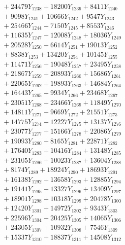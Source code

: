 \documentclass[a4paper,10pt]{article}
\begin{document}
{\begin{align}
&\;  + 24479 Y_{1238} + 18200 Y_{1239} + 8411 Y_{1240} \\[0.3ex]
&\;  + 9098 Y_{1241} + 10666 Y_{1242} + 9547 Y_{1243} \\[0.3ex]
&\;  + 25466 Y_{1244} + 7150 Y_{1245} + 8553 Y_{1246} \\[0.3ex]
&\;  + 11635 Y_{1247} + 12008 Y_{1248} + 18036 Y_{1249} \\[0.3ex]
&\;  + 20528 Y_{1250} + 6614 Y_{1251} + 19013 Y_{1252} \\[0.3ex]
&\;  + 8838 Y_{1253} + 13420 Y_{1254} + 10145 Y_{1255} \\[0.3ex]
&\;  + 11471 Y_{1256} + 19048 Y_{1257} + 23495 Y_{1258} \\[0.5ex]\allowbreak
&\;  + 21867 Y_{1259} + 20893 Y_{1260} + 15686 Y_{1261} \\[0.3ex]
&\;  + 22065 Y_{1262} + 19893 Y_{1263} + 14684 Y_{1264} \\[0.3ex]
&\;  + 16443 Y_{1265} + 9934 Y_{1266} + 23468 Y_{1267} \\[0.3ex]
&\;  + 23051 Y_{1268} + 23466 Y_{1269} + 11849 Y_{1270} \\[0.3ex]
&\;  + 14811 Y_{1271} + 9669 Y_{1272} + 21551 Y_{1273} \\[0.3ex]
&\;  + 14775 Y_{1274} + 12227 Y_{1275} + 13137 Y_{1276} \\[0.3ex]
&\;  + 23077 Y_{1277} + 15166 Y_{1278} + 22086 Y_{1279} \\[0.3ex]
&\;  + 19093 Y_{1280} + 8165 Y_{1281} + 22871 Y_{1282} \\[0.3ex]
&\;  + 17640 Y_{1283} + 10416 Y_{1284} + 13148 Y_{1285} \\[0.3ex]
&\;  + 23105 Y_{1286} + 10023 Y_{1287} + 13604 Y_{1288} \\[0.5ex]\allowbreak
&\;  + 8174 Y_{1289} + 18924 Y_{1290} + 18693 Y_{1291} \\[0.3ex]
&\;  + 16138 Y_{1292} + 13658 Y_{1293} + 12885 Y_{1294} \\[0.3ex]
&\;  + 19141 Y_{1295} + 13327 Y_{1296} + 13409 Y_{1297} \\[0.3ex]
&\;  + 18901 Y_{1298} + 10318 Y_{1299} + 20478 Y_{1300} \\[0.3ex]
&\;  + 12420 Y_{1301} + 14972 Y_{1302} + 9343 Y_{1303} \\[0.3ex]
&\;  + 22596 Y_{1304} + 20425 Y_{1305} + 14065 Y_{1306} \\[0.3ex]
&\;  + 24305 Y_{1307} + 10932 Y_{1308} + 7546 Y_{1309} \\[0.3ex]
&\;  + 15337 Y_{1310} + 18837 Y_{1311} + 14508 Y_{1312} \\[0.3ex]

\end{align}}
\end{document}

